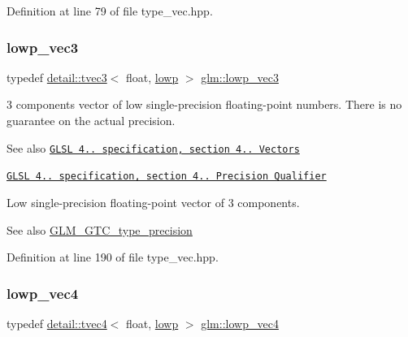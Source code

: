Definition at line 79 of file type\+\_\+vec.\+hpp.

\mbox{\label{group__core__precision_ga062795097526e2758d34cb38387dd82d}} 
\subsubsection{\texorpdfstring{lowp\+\_\+vec3}{lowp\_vec3}}
{\footnotesize\ttfamily typedef \hyperlink{structglm_1_1detail_1_1tvec3}{detail\+::tvec3}$<$ float, \hyperlink{namespaceglm_a0f04f086094c747d227af4425893f545ae161af3fc695e696ce3bf69f7332bc2d}{lowp} $>$ \hyperlink{group__core__precision_ga062795097526e2758d34cb38387dd82d}{glm\+::lowp\+\_\+vec3}}

3 components vector of low single-\/precision floating-\/point numbers. There is no guarantee on the actual precision.

\begin{DoxySeeAlso}{See also}
\href{http://www.opengl.org/registry/doc/GLSLangSpec.4.20.8.pdf}{\tt G\+L\+SL 4.. specification, section 4.. Vectors} 

\href{http://www.opengl.org/registry/doc/GLSLangSpec.4.20.8.pdf}{\tt G\+L\+SL 4.. specification, section 4.. Precision Qualifier}
\end{DoxySeeAlso}
Low single-\/precision floating-\/point vector of 3 components. \begin{DoxySeeAlso}{See also}
\hyperlink{group__gtc__type__precision}{G\+L\+M\+\_\+\+G\+T\+C\+\_\+type\+\_\+precision} 
\end{DoxySeeAlso}


Definition at line 190 of file type\+\_\+vec.\+hpp.

\mbox{\label{group__core__precision_ga706ad1296c1cdcbd26c815fbb0f3f846}} 
\subsubsection{\texorpdfstring{lowp\+\_\+vec4}{lowp\_vec4}}
{\footnotesize\ttfamily typedef \hyperlink{structglm_1_1detail_1_1tvec4}{detail\+::tvec4}$<$ float, \hyperlink{namespaceglm_a0f04f086094c747d227af4425893f545ae161af3fc695e696ce3bf69f7332bc2d}{lowp} $>$ \hyperlink{group__core__precision_ga706ad1296c1cdcbd26c815fbb0f3f846}{glm\+::lowp\+\_\+vec4}}


